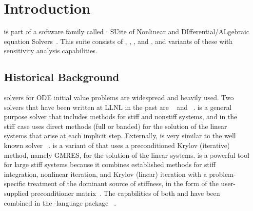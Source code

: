 \chapter{Introduction}\label{s:intro}

{\cvode} is part of a software family called {\sundials}: 
SUite of Nonlinear and DIfferential/ALgebraic equation Solvers~\cite{HBGLSSW:05}.  
This suite consists of {\cvode}, {\arkode}, {\kinsol}, and {\ida}, and variants
of these with sensitivity analysis capabilities.
%
\section{Historical Background}\label{ss:history}

{\F} solvers for ODE initial value problems are widespread and heavily used. 
Two solvers that have been written at LLNL in the past are {\vode}~\cite{BBH:89} 
and {\vodpk}~\cite{Byr:92}.
{\vode} is a general purpose solver that includes methods for
stiff and nonstiff systems, and in the stiff case uses direct methods (full or
banded) for the solution of the linear systems that arise at each implicit
step. Externally, {\vode} is very similar to the well known solver
{\lsode}~\cite{RaHi:94}. {\vodpk}
is a variant of {\vode} that uses a preconditioned Krylov (iterative)
method, namely GMRES, for the solution of the linear systems. {\vodpk}
is a powerful tool for large stiff systems because it combines
established methods for stiff integration, nonlinear iteration, and
Krylov (linear) iteration with a problem-specific treatment of the
dominant source of stiffness, in the form of the user-supplied
preconditioner matrix~\cite{BrHi:89}.  The capabilities of both
{\vode} and {\vodpk} have been combined in the {\CC}-language package
{\cvode}~\cite{CoHi:96}.

